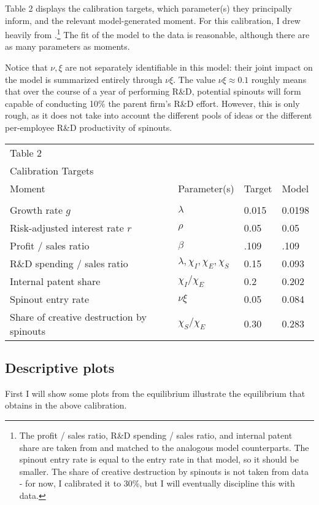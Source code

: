 \documentclass[11pt,english]{article}
\theoremstyle{remark}
\begin{document}
Table 2 displays the calibration targets, which parameter(s) they principally inform, and the relevant model-generated moment. For this calibration, I drew heavily from \cite{akcigit_growth_2018}.\footnote{The profit / sales ratio, R\&D spending / sales ratio, and internal patent share are taken from \cite{akcigit_growth_2018} and matched to the analogous model counterparts. The spinout entry rate is equal to the entry rate in that model, so it should be smaller. The share of creative destruction by spinouts is not taken from data - for now, I calibrated it to 30\%, but I will eventually discipline this with data.} The fit of the model to the data is reasonable, although there are as many parameters as moments.

Notice that $\nu,\xi$ are not separately identifiable in this model: their joint impact on the model is summarized entirely through $\nu \xi$. The value $\nu \xi \approx 0.1$ roughly means that over the course of a year of performing R\&D, potential spinouts will form capable of conducting 10\% the parent firm's R\&D effort. However, this is only rough, as it does not take into account the different pools of ideas or the different per-employee R\&D productivity of spinouts. 

\begin{table}[h]
	\centering{}%
	\begin{tabular}{llll}
		Table 2 & & &  \tabularnewline
		Calibration Targets & & &  \tabularnewline
		\hline 
		Moment & Parameter(s) & Target & Model \tabularnewline
		&  &  & \tabularnewline
		\hline 
		Growth rate $g$ & $\lambda$ & 0.015 & 0.0198 \tabularnewline
		Risk-adjusted interest rate $r$ & $\rho$ & 0.05 & 0.05 \tabularnewline
		Profit / sales ratio & $\beta$ & .109 & .109 \tabularnewline
		R\&D spending / sales ratio & $\lambda,\chi_I,\chi_E,\chi_S$ & 0.15 & 0.093
		\tabularnewline
		Internal patent share & $\chi_I / \chi_E$ & 0.2 & 0.202
		\tabularnewline
		Spinout entry rate & $\nu \xi$ & 0.05 & 0.084
		\tabularnewline
		Share of creative destruction by spinouts & $ \chi_S / \chi_E$ & 0.30 & 0.283 
	\end{tabular}
\end{table}

\subsection{Descriptive plots}

First I will show some plots from the equilibrium illustrate the equilibrium that obtains in the above calibration. 
\end{document}
